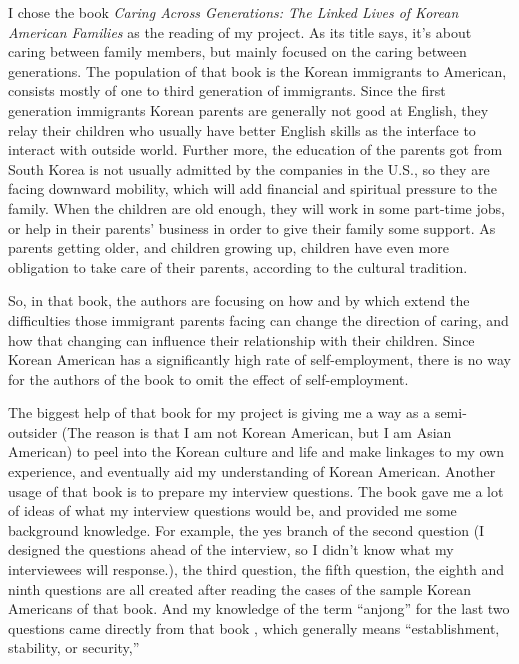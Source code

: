 I chose the book \emph{Caring Across Generations: The Linked Lives of Korean
American Families} as the reading of my project. As its title says, it's about
caring between family members, but mainly focused on the caring between
generations. The population of that book is the Korean immigrants to American,
consists mostly of one to third generation of immigrants. Since the first
generation immigrants Korean parents are generally not good at English, they
relay their children who usually have better English skills as the interface to
interact with outside world. Further more, the education of the parents got from
South Korea is not usually admitted by the companies in the U.S., so they are
facing downward mobility, which will add financial and spiritual pressure to the
family. When the children are old enough, they will work in some part-time jobs,
or help in their parents' business in order to give their family some support.
As parents getting older, and children growing up, children have even more
obligation to take care of their parents, according to the cultural tradition.
\par
So, in that book, the authors are focusing on how and by which extend the
difficulties those immigrant parents facing can change the direction of
caring, and how that changing can influence their relationship with their
children. Since Korean American has a significantly high rate of
self-employment, there is no way for the authors of the book to omit the effect
of self-employment.
\par
The biggest help of that book for my project is giving me a way as a
semi-outsider (The reason is that I am not Korean American, but I am Asian
American) to peel into the Korean culture and life and make linkages to my own
experience, and eventually aid my understanding of Korean American. Another
usage of that book is to prepare my interview questions. The book gave me a lot
of ideas of what my interview questions would be, and provided me some
background knowledge. For example, the yes branch of the second question (I
designed the questions ahead of the interview, so I didn't know what my
interviewees will response.), the third question, the fifth question, the eighth
and ninth questions are all created after reading the cases of the sample Korean
Americans of that book. And my knowledge of the term ``anjong'' for the last two
questions came directly from that book \cite[p.~40, p.~41]{book:ISelected}, 
which generally means ``establishment, stability, or security,''

